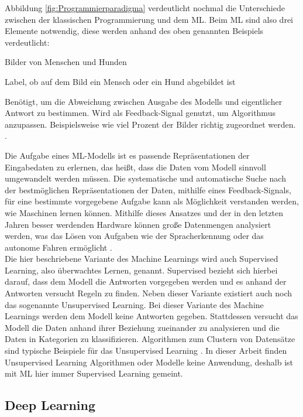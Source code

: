 Abbildung \ref*{fig:Programmierparadigma} verdeutlicht nochmal die Unterschiede zwischen der klassischen Programmierung und dem \ac{ML}. Beim \ac{ML} sind also drei Elemente
notwendig, diese werden anhand des oben genannten Beispiels verdeutlicht: 

\begin{description}[style=multiline,leftmargin=3cm,font=\bfseries]
    \item[Eingabedaten] Bilder von Menschen und Hunden \cite[S.24]{DL_PY}
    \item[Antworten] Label, ob auf dem Bild ein Mensch oder ein Hund abgebildet ist \cite[S.24]{DL_PY}
    \item[Metrik zur Bewertung des Algorithmus] Benötigt, um die Abweichung zwischen Ausgabe des Modells und eigentlicher Antwort zu bestimmen. Wird als Feedback-Signal genutzt,
    um Algorithmus anzupassen. Beispielsweise wie viel Prozent der Bilder richtig zugeordnet werden. \cite[S.24f.]{DL_PY}.  
\end{description}

Die Aufgabe eines \ac{ML}-Modells ist es passende Repräsentationen der Eingabedaten zu erlernen, das heißt, dass die Daten vom Modell sinnvoll umgewandelt werden müssen. 
Die systematische und automatische Suche nach der bestmöglichen Repräsentationen der Daten, mithilfe eines Feedback-Signals, für eine bestimmte vorgegebene Aufgabe kann als Möglichkeit verstanden werden, wie 
Maschinen lernen können. Mithilfe dieses Ansatzes und der in den letzten Jahren besser werdenden Hardware können große Datenmengen analysiert werden, was das Lösen von Aufgaben wie der Spracherkennung 
oder das autonome Fahren ermöglicht \cite[vgl. S.24ff.]{DL_PY}.\\

Die hier beschriebene Variante des Machine Learnings wird auch Supervised Learning, also überwachtes Lernen, genannt. \glqq Supervised\grqq{} bezieht sich hierbei darauf, dass
dem Modell die Antworten vorgegeben werden und es anhand der Antworten versucht Regeln zu finden. Neben dieser Variante existiert auch noch das sogenannte
Unsupervised Learning. Bei dieser Variante des Machine Learnings werden dem Modell keine Antworten gegeben. Stattdessen versucht das Modell die Daten anhand ihrer
Beziehung zueinander zu analysieren und die Daten in Kategorien zu klassifizieren. Algorithmen zum Clustern von Datensätze sind typische Beispiele für das Unsupervised Learning
\cite[vgl. S.47ff.]{AI_Huawei}. In dieser Arbeit finden Unsupervised Learning Algorithmen oder Modelle keine Anwendung, deshalb ist mit \ac{ML} hier immer Supervised Learning gemeint.

\subsection{Deep Learning}
